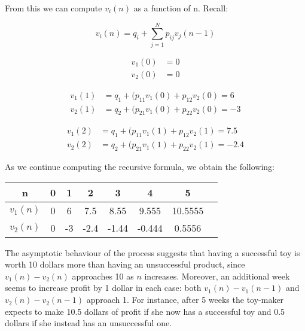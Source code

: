 \documentclass[../main.tex]{subfiles}
\begin{document}
\begin{small}
\noindent From this we can compute $v_i(n)$ as a function of n. Recall:

\begin{equation}
    v_i(n) = q_i + \sum_{j=1}^N p_{ij}v_j(n-1) 
\end{equation}


\begin{equation}
\begin{split}
     v_1(0) &= 0\\ 
     v_2(0) &= 0 
\end{split}
\end{equation}


\begin{equation}
\begin{split}
     v_1(1) &= q_1 + (p_{11}v_1(0) +p_{12}v_2(0) = 6  \\ 
     v_2(1) &= q_2 + (p_{21}v_1(0) +p_{22}v_2(0) = -3
\end{split}
\end{equation}

\begin{equation}
\begin{split}
     v_1(2) &= q_1 + (p_{11}v_1(1) +p_{12}v_2(1) = 7.5  \\ 
     v_2(2) &= q_2 + (p_{21}v_1(1) +p_{22}v_2(1) = -2.4
\end{split}
\end{equation}

\noindent As we continue computing the recursive formula, we obtain the following:

\begin{center} 
\begin{tabular}{ c|c|c|c|c|c|c|c  } 
 n & 0 & 1 & 2 & 3& 4 & 5 & \\ 
 \hline
 $v_1(n)$ & 0& 6& 7.5& 8.55& 9.555&10.5555 \\ 
 $v_2(n)$  & 0 & -3  & -2.4 & -1.44 &-0.444 & 0.5556\\ 
\end{tabular}
\end{center}

The asymptotic behaviour of the process suggests that having a successful toy is worth 10 dollars more than having an unsuccessful product, since $v_1(n) - v_2(n)$ approaches 10 as $n$ increases. Moreover, an additional week seems to increase profit by  1 dollar in each case: both $v_1(n) - v_1(n-1)$ and $v_2(n) - v_2(n-1)$ approach 1. For instance, after 5 weeks the toy-maker expects to make 10.5 dollars of profit if she now has a successful toy and 0.5 dollars if she instead has an unsuccessful one.
\end{small}
\end{document}
